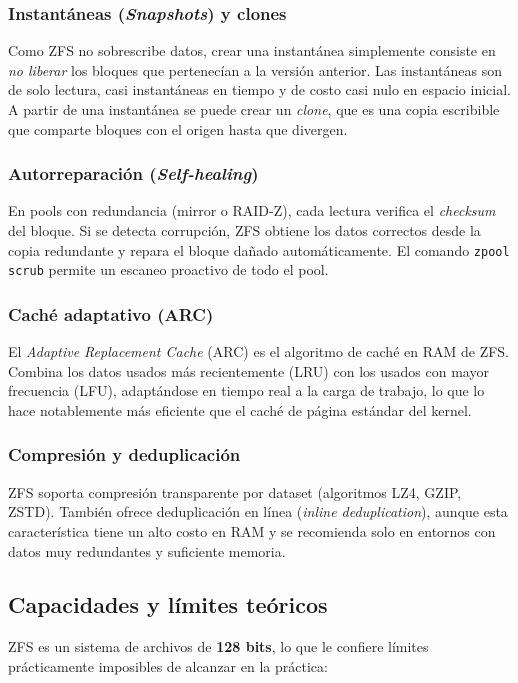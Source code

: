 \documentclass[12pt,letterpaper]{article}
\begin{document}
\subsubsection{Instantáneas (\emph{Snapshots}) y clones}
Como ZFS no sobrescribe datos, crear una instantánea simplemente consiste en \emph{no liberar} los bloques que
pertenecían a la versión anterior. Las instantáneas son de solo lectura, casi instantáneas en tiempo y de costo
casi nulo en espacio inicial. A partir de una instantánea se puede crear un \emph{clone}, que es una copia
escribible que comparte bloques con el origen hasta que divergen.

\subsubsection{Autorreparación (\emph{Self-healing})}
En pools con redundancia (mirror o RAID-Z), cada lectura verifica el \emph{checksum} del bloque. Si se detecta
corrupción, ZFS obtiene los datos correctos desde la copia redundante y repara el bloque dañado automáticamente.
El comando \texttt{zpool scrub} permite un escaneo proactivo de todo el pool.

\subsubsection{Caché adaptativo (ARC)}
El \emph{Adaptive Replacement Cache} (ARC) es el algoritmo de caché en RAM de ZFS. Combina los datos usados más
recientemente (LRU) con los usados con mayor frecuencia (LFU), adaptándose en tiempo real a la carga de trabajo,
lo que lo hace notablemente más eficiente que el caché de página estándar del kernel.

\subsubsection{Compresión y deduplicación}
ZFS soporta compresión transparente por dataset (algoritmos LZ4, GZIP, ZSTD). También ofrece deduplicación en
línea (\emph{inline deduplication}), aunque esta característica tiene un alto costo en RAM y se recomienda solo
en entornos con datos muy redundantes y suficiente memoria.

\subsection{Capacidades y límites teóricos}
ZFS es un sistema de archivos de \textbf{128 bits}, lo que le confiere límites prácticamente imposibles de
alcanzar en la práctica:
\end{document}
